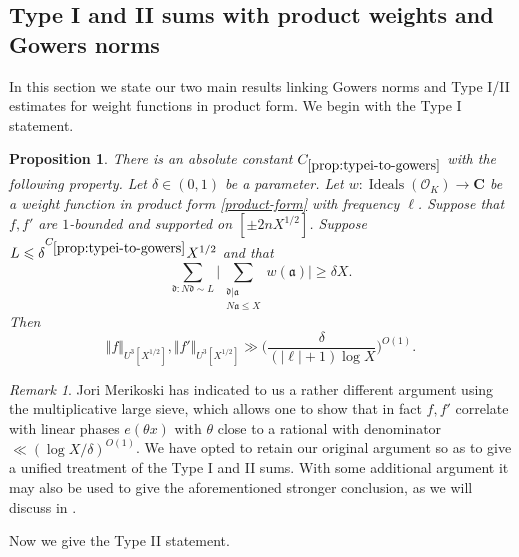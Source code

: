 \documentclass[11pt,reqno]{amsart}
\numberwithin{equation}{section}
\newtheorem{proposition}[theorem]{Proposition}
\theoremstyle{definition}
\theoremstyle{remark}
\newtheorem*{remark}{Remark}
\newcommand{\mf}{\mathfrak}
\renewcommand{\le}{\leqslant}
\renewcommand{\ge}{\geqslant}
\newcommand\C{\mathbf{C}}
\newcommand\Ideals{\operatorname{Ideals}}
\renewcommand\O{\mathcal{O}}
\begin{document}
\subsection{Type I and II sums with product weights and Gowers norms}

In this section we state our two main results linking Gowers norms and Type I/II estimates for weight functions in product form. We begin with the Type I statement.

\begin{proposition}\label{prop:typei-to-gowers}
There is an absolute constant $C_{\ref{prop:typei-to-gowers}}$ with the following property. Let $\delta \in (0,1)$ be a parameter. Let $w : \Ideals(\O_K) \rightarrow \C$ be a weight function in product form \cref{product-form} with frequency $\ell$. Suppose that $f, f'$ are $1$-bounded and supported on $[\pm 2n X^{1/2}]$. Suppose $L \le \delta^{C_{\ref{prop:typei-to-gowers}}} X^{1/2}$ and that 
\begin{equation}\label{large-typei-assump} \sum_{\mf{d} : N\mf{d} \sim L} \Big| \sum_{\substack{\mf{d} | \mf{a} \\ N \mf{a} \le X}}  w(\mf{a})\Big| \ge \delta X.\end{equation}
Then \[ \Vert f \Vert_{U^3[X^{1/2}]}, \Vert f' \Vert_{U^3[X^{1/2}]} \gg \Big(\frac{\delta}{(|\ell|+1) \log X} \Big)^{O(1)} .\]
\end{proposition}
\begin{remark}
Jori Merikoski has indicated to us a rather different argument using the multiplicative large sieve, which allows one to show that in fact $f, f'$ correlate with linear phases $e(\theta x)$ with $\theta$ close to a rational with denominator $\ll (\log X/\delta)^{O(1)}$. We have opted to retain our original argument so as to give a unified treatment of the Type I and II sums. With some additional argument it may also be used to give the aforementioned stronger conclusion, as we will discuss in \cite{GS24}. 
\end{remark}
Now we give the Type II statement.
\end{document}
